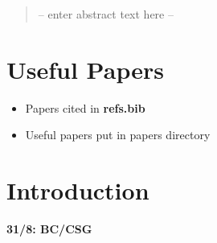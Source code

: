 \documentclass{pnastwo}
\begin{document}
\begin{article}

\begin{abstract} -- enter abstract text here -- \end{abstract}







\section{Useful Papers}

\begin{itemize}
\item Papers cited in \textbf{refs.bib}
\item Useful papers put in papers directory
\end{itemize}



\section{Introduction}
\label{s:intro}\textbf{31/8: BC/CSG}


\end{article}
\end{document}
